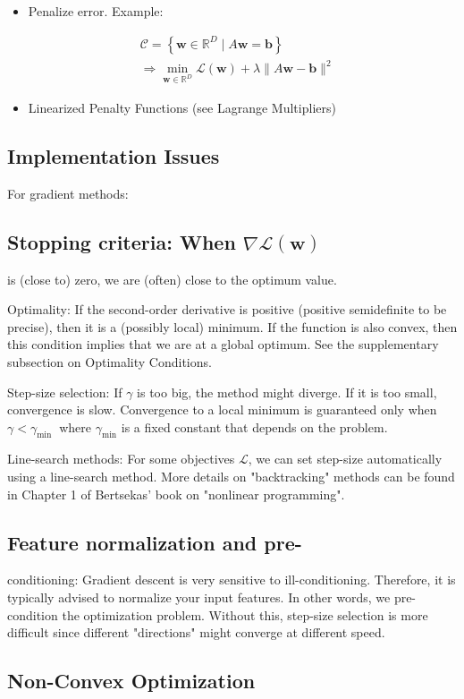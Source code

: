\begin{itemize}
  \item Penalize error. Example:
\end{itemize}

$$
\begin{aligned}
& \mathcal{C}=\left\{\mathbf{w} \in \mathbb{R}^{D} \mid A \mathbf{w}=\mathbf{b}\right\} \\
& \Rightarrow \min _{\mathbf{w} \in \mathbb{R}^{D}} \mathcal{L}(\mathbf{w})+\lambda\|A \mathbf{w}-\mathbf{b}\|^{2}
\end{aligned}
$$

\begin{itemize}
  \item Linearized Penalty Functions (see Lagrange Multipliers)
\end{itemize}

\subsection*{Implementation Issues}
For gradient methods:

\subsection*{Stopping criteria: When $\nabla \mathcal{L}(\mathbf{w})$}
is (close to) zero, we are (often) close to the optimum value.

Optimality: If the second-order derivative is positive (positive semidefinite to be precise), then it is a (possibly local) minimum. If the function is also convex, then this condition implies that we are at a global optimum. See the supplementary subsection on Optimality Conditions.

Step-size selection: If $\gamma$ is too big, the method might diverge. If it is too small, convergence is slow. Convergence to a local minimum is guaranteed only when $\gamma<\gamma_{\text {min }}$ where $\gamma_{\min }$ is a fixed constant that depends on the problem.

Line-search methods: For some objectives $\mathcal{L}$, we can set step-size automatically using a line-search method. More details on "backtracking" methods can be found in Chapter 1 of Bertsekas' book on "nonlinear programming".

\subsection*{Feature normalization and pre-}
 conditioning: Gradient descent is very sensitive to ill-conditioning. Therefore, it is typically advised to normalize your input features. In other words, we pre-condition the optimization problem. Without this, step-size selection is more difficult since different "directions" might converge at different speed.\subsection*{Non-Convex Optimization}


